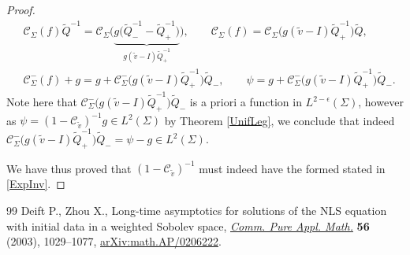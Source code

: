 \documentclass[10pt,a4paper]{amsart}
\newcommand{\Id}{I}
\newcommand{\tQ}{{\widetilde Q}}
\newcommand{\tv}{{\widetilde v}}
\newcommand{\Cau}{\mathcal C_{\Sigma}}
\newcommand{\Cautv}{\mathcal C_{\tv}}
\newcommand{\Ltwo}{L^2(\Sigma)}
\numberwithin{equation}{section}
\begin{document}
\begin{proof}
 \begin{align*}
& \Cau(f) \tQ^{-1} = \Cau\big(\underbrace{g\big(\tQ_-^{-1}-\tQ_+^{-1}\big)}_{g(\tilde v-\Id) \tQ_+^{-1}}\big),\qquad
 \Cau(f) = \Cau\big(g (\tv-\Id) \tQ_+^{-1}\big)\tQ,
 \\
& \Cau^-(f) + g = g + \Cau^{-}\big(g (\tv-\Id) \tQ_+^{-1}\big)\tQ_-,\qquad
 \psi = g + \Cau^-\big(g (\tv-\Id) \tQ_+^{-1}\big)\tQ_-.
\end{align*}
Note here that $\Cau^-\big(g (\tv-\Id) \tQ_+^{-1}\big)\tQ_-$ is a priori a function in $L^{2-\epsilon}(\Sigma)$, however as $\psi = (1-\Cautv)^{-1}g \in L^2(\Sigma)$ by Theorem \ref{UnifLeg}, we conclude that indeed $\Cau^-\big(g (\tv-\Id) \tQ_+^{-1}\big)\tQ_- = \psi - g \in \Ltwo$.

We have thus proved that $(1-\Cautv)^{-1}$ must indeed have the formed stated in \eqref{ExpInv}.
\end{proof}

\begin{thebibliography}{99}
Deift P., Zhou X., Long-time asymptotics for solutions of the {NLS} equation
 with initial data in a weighted {S}obolev space, \href{https://doi.org/10.1002/cpa.3034}{\textit{Comm. Pure Appl.
 Math.}} \textbf{56} (2003), 1029--1077, \href{https://arxiv.org/abs/math.AP/0206222}{arXiv:math.AP/0206222}.
\end{thebibliography}
\end{document}
